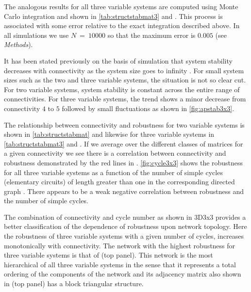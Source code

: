 The analogous results for all three variable systems are computed using Monte Carlo integration and shown in \ref{tab:structstabmat3} and . This process is associated with some error relative to the exact integration described above. In all simulations we use $N~=~10000$ so that the maximum error is $0.005$ (see \emph{Methods}).

It has been stated previously on the basis of simulation that system stability decreases with connectivity as the system size goes to infinity \cite{May1972}. For small system sizes such as the two and three variable systems, the situation is not so clear cut. For two variable systems, system stability is constant across the entire range of connectivities. For three variable systems, the trend shows a minor decrease from connectivity $4$ to $5$ followed by small fluctuations as shown in \ref{fig:apstab3x3}.

The relationship between connectivity and robustness for two variable systems is shown in \ref{tab:structstabmat} and likewise for three variable systems in \ref{tab:structstabmat3} and . If we average over the different classes of matrices for a given connectivity we see there is a correlation between connectivity and robustness demonstrated by the red lines in .
\ref{fig:cycle3x3} shows the robustness for all three variable systems as a function of the number of simple cycles (elementary circuits) of length greater than one in the corresponding directed graph \cite{Johnson1975}. There appears to be a weak negative correlation between robustness and the number of simple cycles.

The combination of connectivity and cycle number as shown in 3D3x3 provides a better classification of the dependence of robustness upon network topology. Here the robustness of three variable systems with a given number of cycles, increases monotonically with connectivity. The network with the highest robustness for three variable systems is that of  (top panel). This network is the most hierarchical of all three variable systems in the sense that it represents a total ordering of the components of the network and its adjacency matrix also shown in  (top panel) has a block triangular structure.

